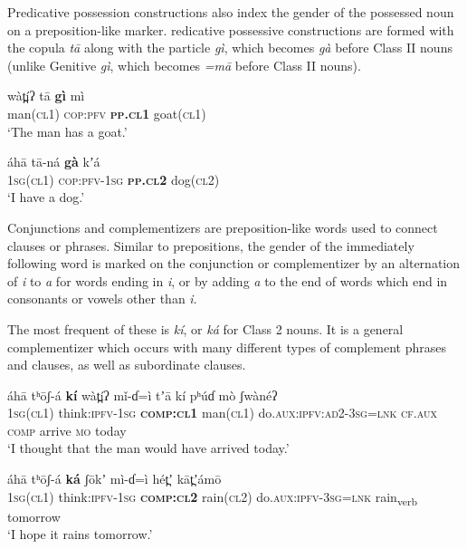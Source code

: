 \documentclass[output=collectionpaper,hidelinks]{langscibook}
\theoremstyle{remark}
\begin{document}
Predicative possession constructions also index the gender of the possessed noun on
a preposition-like marker.  redicative possessive constructions are formed with
the copula \emph{tā} along with the particle \emph{gì}, which becomes
\emph{gà} before Class II nouns (unlike Genitive \textit{gì}, which becomes \textit{=mā} before Class II nouns).

\ea
\gll  wàt̪íʔ tā \textbf{gì} mì \\
 man(\textsc{cl1}) \textsc{cop}:\textsc{pfv} \textbf{\textsc{pp.cl1}} goat(\textsc{cl1}) \\
\glt `The man has a goat.' \\
\z

\ea
\gll  áhā tā-ná \textbf{gà} kʼá \\
 \textsc{1sg}(\textsc{cl1}) \textsc{cop}:\textsc{pfv}-\textsc{1sg} \textbf{\textsc{pp.cl2}} dog(\textsc{cl2}) \\
\glt `I have a dog.' \\
\z

Conjunctions and complementizers are preposition-like words used to connect
clauses or phrases. Similar to prepositions, the gender of the immediately
following word is marked on the conjunction or complementizer by an alternation
of \emph{i} to \emph{a} for words ending in \emph{i}, or by adding \emph{a} to
the end of words which end in consonants or vowels other than \emph{i}.

The most frequent of these is \emph{kí}, or \emph{ká} for Class 2 nouns. It
is a general complementizer which occurs with many different types of complement
phrases and clauses, as well as subordinate clauses.

\ea
\gll  áhā tʰōʃ-á \textbf{kí} wàt̪íʔ mǐ-ɗ=ì tʼā kí pʰúɗ mò ʃwànéʔ \\
 \textsc{1sg}(\textsc{cl1}) think:\textsc{ipfv}-\textsc{1sg} \textbf{\textsc{comp:cl1}} man(\textsc{cl1}) do.\textsc{aux}:\textsc{ipfv:ad2}-\textsc{3sg}=\textsc{lnk} \textsc{cf.aux} \textsc{comp} arrive \textsc{mo} today \\
\glt `I thought that the man would have arrived today.' \\
\z

\ea
\gll  áhā tʰōʃ-á \textbf{ká} ʃōkʼ mì-ɗ=ì hét̪ʼ {kāt̪ʼámō} \\
 \textsc{1sg}(\textsc{cl1}) think:\textsc{ipfv}-\textsc{1sg} \textbf{\textsc{comp:cl2}} rain(\textsc{cl2}) do.\textsc{aux}:\textsc{ipfv}-\textsc{3sg}=\textsc{lnk} rain\textsubscript{verb} tomorrow \\
\glt `I hope it rains tomorrow.' \\
\z
\end{document}
